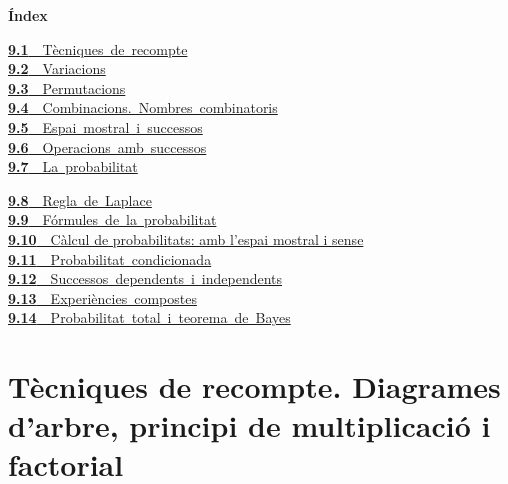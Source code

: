 \documentclass[11pt,a4paper]{article}
\begin{document}
\begin{tcolorbox}[colback=fmsurface,colframe=fmsurface,arc=3mm,left=4mm,right=4mm,top=2mm,bottom=2mm]
\small\textbf{Índex}\par\smallskip
\begin{minipage}[t]{0.49\linewidth}\small \mbox{\hyperlink{sec1}{\textbf{\color{fmgreen}9.1}\ \ Tècniques de recompte}}\\[3pt]
\mbox{\hyperlink{sec2}{\textbf{\color{fmgreen}9.2}\ \ Variacions}}\\[3pt]
\mbox{\hyperlink{sec3}{\textbf{\color{fmgreen}9.3}\ \ Permutacions}}\\[3pt]
\mbox{\hyperlink{sec4}{\textbf{\color{fmgreen}9.4}\ \ Combinacions. Nombres combinatoris}}\\[3pt]
\mbox{\hyperlink{sec5}{\textbf{\color{fmgreen}9.5}\ \ Espai mostral i successos}}\\[3pt]
\mbox{\hyperlink{sec6}{\textbf{\color{fmgreen}9.6}\ \ Operacions amb successos}}\\[3pt]
\mbox{\hyperlink{sec7}{\textbf{\color{fmgreen}9.7}\ \ La probabilitat}}\\[3pt]\end{minipage}\hfill\begin{minipage}[t]{0.49\linewidth}\small \mbox{\hyperlink{sec8}{\textbf{\color{fmgreen}9.8}\ \ Regla de Laplace}}\\[3pt]
\mbox{\hyperlink{sec9}{\textbf{\color{fmgreen}9.9}\ \ Fórmules de la probabilitat}}\\[3pt]
\hyperlink{sec10}{\textbf{\color{fmgreen}9.10}\ \ Càlcul de probabilitats: amb l'espai mostral i sense}\\[3pt]
\mbox{\hyperlink{sec11}{\textbf{\color{fmgreen}9.11}\ \ Probabilitat condicionada}}\\[3pt]
\mbox{\hyperlink{sec12}{\textbf{\color{fmgreen}9.12}\ \ Successos dependents i independents}}\\[3pt]
\mbox{\hyperlink{sec13}{\textbf{\color{fmgreen}9.13}\ \ Experiències compostes}}\\[3pt]
\mbox{\hyperlink{sec14}{\textbf{\color{fmgreen}9.14}\ \ Probabilitat total i teorema de Bayes}}\\[3pt]\end{minipage}
\end{tcolorbox}

\Needspace{6.2cm}
\section{Tècniques de recompte. Diagrames d'arbre, principi de multiplicació i factorial}\hypertarget{sec1}{}
\end{document}
